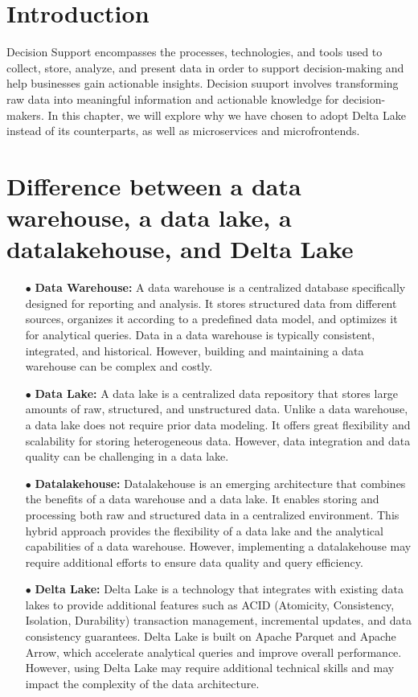 
\section*{Introduction}

Decision Support encompasses the processes, technologies, and tools used to collect, store, analyze, and present data in order to support decision-making and help businesses gain actionable insights. Decision suuport involves transforming raw data into meaningful information and actionable knowledge for decision-makers. In this chapter, we will explore why we have chosen to adopt Delta Lake instead of its counterparts, as well as microservices and microfrontends.

\section{Difference between a data warehouse, a data lake, a datalakehouse, and Delta Lake}
\begin{enumerate}
\item[$\bullet$] \textbf{Data Warehouse:} A data warehouse is a centralized database specifically designed for reporting and analysis. It stores structured data from different sources, organizes it according to a predefined data model, and optimizes it for analytical queries. Data in a data warehouse is typically consistent, integrated, and historical. However, building and maintaining a data warehouse can be complex and costly.
\item[$\bullet$] \textbf{Data Lake:} A data lake is a centralized data repository that stores large amounts of raw, structured, and unstructured data. Unlike a data warehouse, a data lake does not require prior data modeling. It offers great flexibility and scalability for storing heterogeneous data. However, data integration and data quality can be challenging in a data lake.
\item[$\bullet$] \textbf{Datalakehouse:} Datalakehouse is an emerging architecture that combines the benefits of a data warehouse and a data lake. It enables storing and processing both raw and structured data in a centralized environment. This hybrid approach provides the flexibility of a data lake and the analytical capabilities of a data warehouse. However, implementing a datalakehouse may require additional efforts to ensure data quality and query efficiency.
\item[$\bullet$] \textbf{Delta Lake:} Delta Lake is a technology that integrates with existing data lakes to provide additional features such as ACID (Atomicity, Consistency, Isolation, Durability) transaction management, incremental updates, and data consistency guarantees. Delta Lake is built on Apache Parquet and Apache Arrow, which accelerate analytical queries and improve overall performance. However, using Delta Lake may require additional technical skills and may impact the complexity of the data architecture.
\end{enumerate}

